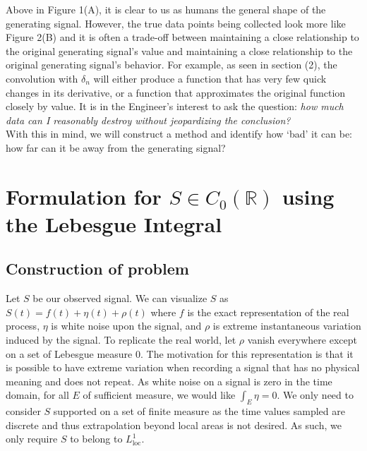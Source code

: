 \documentclass[11pt]{amsart}
\theoremstyle{definition}
\theoremstyle{remark}
\begin{document}
Above in Figure 1(A), it is clear to us as humans the general shape of the generating signal. However, the true data points being collected look more like Figure 2(B) and it is often a trade-off between maintaining a close relationship to the original generating signal's value and maintaining a close relationship to the original generating signal's behavior. For example, as seen in section (2), the convolution with $\delta_n$ will either produce a function that has very few quick changes in its derivative, or a function that approximates the original function closely by value. It is in the Engineer's interest to ask the question: \textit{how much data can I reasonably destroy without jeopardizing the conclusion?}\\

With this in mind, we will construct a method and identify how `bad' it can be: how far can it be away from the generating signal?

\section{Formulation for $S\in C_0(\mathbb{R})$ using the Lebesgue Integral}
\subsection{Construction of problem}
Let $S$ be our observed signal. We can visualize $S$ as $S(t) = f(t) + \eta(t) + \rho(t)$ where $f$ is the exact representation of the real process, $\eta$ is white noise upon the signal, and $\rho$ is extreme instantaneous variation induced by the signal. To replicate the real world, let $\rho$ vanish everywhere except on a set of Lebesgue measure 0. The motivation for this representation is that it is possible to have extreme variation when recording a signal that has no physical meaning and does not repeat. As white noise on a signal is zero in the time domain, for all $E$ of sufficient measure, we would like $\displaystyle\int_E\eta=0$. We only need to consider $S$ supported on a set of finite measure as the time values sampled are discrete and thus extrapolation beyond local areas is not desired. As such, we only require $S$ to belong to $L^1_{\text{loc}}$.
\end{document}
